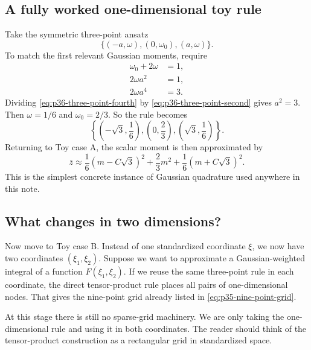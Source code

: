 \documentclass[11pt]{article}
\numberwithin{equation}{section}
\begin{document}
\subsection{A fully worked one-dimensional toy rule}

Take the symmetric three-point ansatz
\begin{equation}
  \{(-a,\omega),(0,\omega_0),(a,\omega)\}.
  \label{eq:p36-three-point-ansatz}
\end{equation}
To match the first relevant Gaussian moments, require
\begin{align}
  \omega_0+2\omega &= 1,
  \label{eq:p36-three-point-mass}\\
  2\omega a^2 &= 1,
  \label{eq:p36-three-point-second}\\
  2\omega a^4 &= 3.
  \label{eq:p36-three-point-fourth}
\end{align}
Dividing \eqref{eq:p36-three-point-fourth} by
\eqref{eq:p36-three-point-second} gives \(a^2=3\).  Then
\(\omega=1/6\) and \(\omega_0=2/3\).  So the rule becomes
\begin{equation}
  \left\{\left(-\sqrt3,\frac16\right),\left(0,\frac23\right),
  \left(\sqrt3,\frac16\right)\right\}.
  \label{eq:p36-three-point-rule}
\end{equation}
Returning to Toy case A, the scalar moment is then approximated by
\begin{equation}
  \bar z
  \approx
  \frac16(m-C\sqrt3)^2 + \frac23 m^2 + \frac16(m+C\sqrt3)^2.
  \label{eq:p36-scalar-three-point-approx}
\end{equation}
This is the simplest concrete instance of Gaussian quadrature used anywhere in
this note.

\subsection{What changes in two dimensions?}

Now move to Toy case B.  Instead of one standardized coordinate \(\xi\), we now
have two coordinates \((\xi_1,\xi_2)\).  Suppose we want to approximate a
Gaussian-weighted integral of a function \(F(\xi_1,\xi_2)\).  If we reuse the same
three-point rule in each coordinate, the direct tensor-product rule places all
pairs of one-dimensional nodes.  That gives the nine-point grid already listed in
\eqref{eq:p35-nine-point-grid}.

At this stage there is still no sparse-grid machinery.  We are only taking the
one-dimensional rule and using it in both coordinates.  The reader should think
of the tensor-product construction as a rectangular grid in standardized space.
\end{document}
